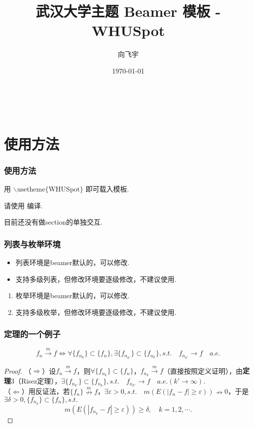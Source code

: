 \documentclass{beamer}
\title{武汉大学主题 Beamer 模板 - WHUSpot}
\author{向飞宇}
\institute{武汉大学}
\date{\today}
\begin{document}
\begin{frame}
    \frametitle{\\}
    \titlepage
\end{frame}

\section{使用方法}

\begin{frame}
    \frametitle{使用方法}
    用 $\backslash \mbox{usetheme\{WHUSpot\}}$ 即可载入模板.

    请使用  编译.

    目前还没有做section的单独交互.
\end{frame}

\begin{frame}
    \frametitle{列表与枚举环境}
    \begin{itemize}
        \item 列表环境是beamer默认的，可以修改. \pause
        \item 支持多级列表，但修改环境要逐级修改，\alert{不建议}使用. \pause
    \end{itemize}

    \begin{enumerate}
        \item 枚举环境是beamer默认的，可以修改. \pause
        \item 支持多级枚举，但修改环境要逐级修改，\alert{不建议}使用.
    \end{enumerate}
\end{frame}

\begin{frame}
    \frametitle{定理的一个例子}
    \begin{theorem}[Risez定理的一个应用]
    \begin{equation*}
        f_n \stackrel{m}{\longrightarrow} f \Leftrightarrow \forall \{f_{n_k}\} \subset \{f_n\}, \exists \{f_{n_{k'}}\} \subset \{f_{n_k}\}, s.t. \quad f_{n_{k'}} \to f \quad a.e.     
    \end{equation*}
    \end{theorem}
    \renewcommand{\qedsymbol}{}
    \begin{proof}
        （$\Rightarrow$）设$f_n \stackrel{m}{\longrightarrow}f$，则$\forall \{f_{n_k}\} \subset \{f_n\}$，$f_{n_k} \stackrel{m}{\longrightarrow} f$（直接按照定义证明），由\textbf{定理$3$}（Risez定理），$\exists \{f_{n_{k'}}\} \subset \{f_{n_k}\}, s.t. \quad f_{n_{k'}} \to f \quad a.e. (k' \to \infty).$ \\
        （$\Leftarrow$）用反证法，若$\{f_n\} \stackrel{m}{\nrightarrow} f$，$\exists \varepsilon > 0, s.t. \quad m(E(|f_n - f| \geqslant \varepsilon)) \nrightarrow 0$，于是$\exists \delta > 0, \{f_{n_k}\} \subset \{f_n\}, s.t.$ \[m(E(|f_{n_k} - f| \geqslant \varepsilon)) \geqslant \delta, \quad k = 1, 2, \cdots.\] 
    \end{proof}
\end{frame}
\end{document}
